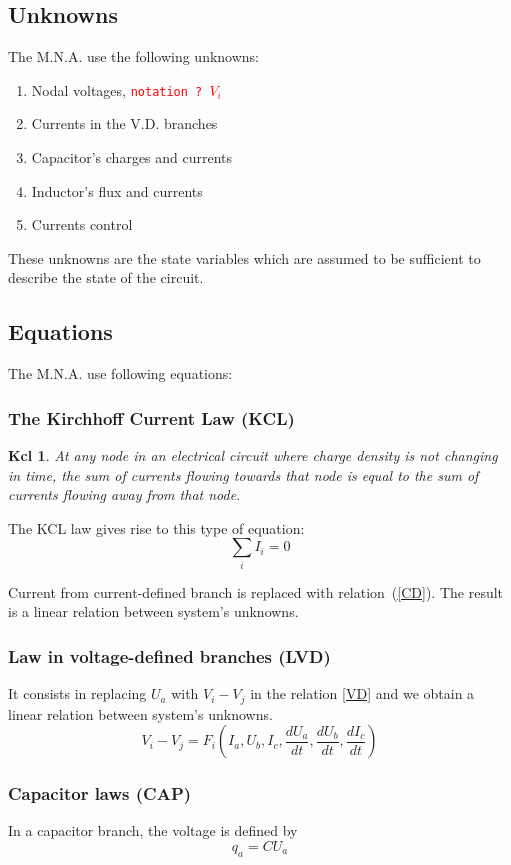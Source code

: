 \subsection{Unknowns}
The M.N.A. use the following unknowns:
\begin{enumerate}
\item Nodal voltages, {\textcolor{red}{ \tt notation ? $V_i$}}
\item Currents in the V.D. branches
\item Capacitor's charges and currents
\item Inductor's flux and currents
\item Currents control
\end{enumerate}
These unknowns are the state variables which are assumed to be sufficient to describe the state of the circuit.
\subsection{Equations}
The M.N.A. use following equations:
\subsubsection{The Kirchhoff Current Law (KCL)}
\newtheorem{kcl}{Kcl}
\begin{kcl}
At any node in an electrical circuit where charge density is not changing in time, the sum of
currents flowing towards that node is equal to the sum of currents flowing away from that node.
\end{kcl}
The KCL law gives rise to this type of equation:\\
\begin{equation}
 \sum_{i} I_{i}=0\label{eq:KCL}
\end{equation}

Current from current-defined branch is replaced with relation~(\ref{CD}). The result is a linear relation between system's unknowns.
\subsubsection{Law in voltage-defined branches (LVD)}
It consists in replacing $U_{a}$ with $V_{i}-V_{j}$ in the relation \ref{VD} and we obtain a linear relation between system's unknowns.
\[V_{i}-V_{j}=F_{i}(I_{a},U_{b},I_{c},\frac{dU_a}{dt},\frac{dU_b}{dt},\frac{dI_{c}}{dt})\]
\subsubsection{Capacitor laws (CAP)}
In a capacitor branch, the voltage is defined by 
\begin{equation}
 q_{a}=CU_{a} 
\end{equation}

